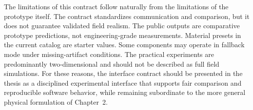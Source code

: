 The limitations of this contract follow naturally from the limitations of the prototype itself. The contract standardizes communication and comparison, but it does not guarantee validated field realism. The public outputs are comparative prototype predictions, not engineering-grade measurements. Material presets in the current catalog are starter values. Some components may operate in fallback mode under missing-artifact conditions. The practical experiments are predominantly two-dimensional and should not be described as full field simulations. For these reasons, the interface contract should be presented in the thesis as a disciplined experimental interface that supports fair comparison and reproducible software behavior, while remaining subordinate to the more general physical formulation of Chapter~2.
